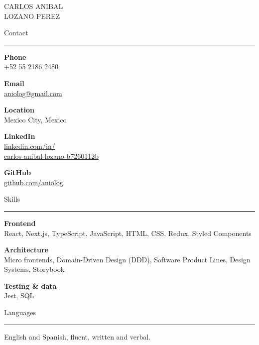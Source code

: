\documentclass[10pt,a4paper]{article}
\renewcommand{\section}[1]{%
  \vspace{7pt}%
  {\fontsize{14}{16}\selectfont\color{heading}#1}\par
  \vspace{-4pt}\rule{\linewidth}{0.6pt}\par\vspace{3pt}}
\newcommand{\link}[2]{\href{#1}{\textcolor{linkblue}{#2}}}
\begin{document}
\small

\begin{minipage}[t]{0.26\textwidth}
\vspace{0pt}\raggedright
{\fontsize{18}{22}\selectfont CARLOS ANIBAL\\LOZANO PEREZ\par}
\vspace{6pt}

\section{Contact}
\textbf{Phone}\\
+52 55 2186 2480

\vspace{5pt}
\textbf{Email}\\
\link{mailto:aniolog@gmail.com}{aniolog@gmail.com}

\vspace{5pt}
\textbf{Location}\\
Mexico City, Mexico

\vspace{5pt}
\textbf{LinkedIn}\\
\link{https://www.linkedin.com/in/carlos-anibal-lozano-b7260112b}{linkedin.com/in/}\\
\link{https://www.linkedin.com/in/carlos-anibal-lozano-b7260112b}{carlos-anibal-lozano-b7260112b}

\vspace{5pt}
\textbf{GitHub}\\
\link{https://github.com/aniolog}{github.com/aniolog}

\section{Skills}
\textbf{Frontend}\\
React, Next.js, TypeScript, JavaScript, HTML, CSS, Redux, Styled Components

\vspace{6pt}
\textbf{Architecture}\\
Micro frontends, Domain-Driven Design (DDD), Software Product Lines, Design Systems, Storybook

\vspace{6pt}
\textbf{Testing \& data}\\
Jest, SQL

\section{Languages}
English and Spanish, fluent, written and verbal.
\end{minipage}%
\end{document}
